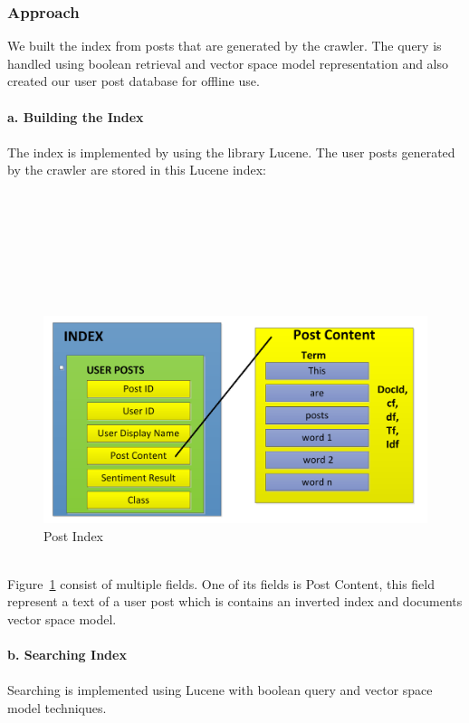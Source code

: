 \subsubsection*{Approach}
	We built the index from posts that are generated by the crawler. The query is handled using boolean retrieval and vector space model representation and also created our user post database for offline use.\\\\
	\textbf{a. Building the Index} \\\\
	The index is implemented by using the library Lucene. The user posts generated by the crawler are stored in this Lucene index: \\\\\\\\\\\\\\\\
	\begin{figure}[h]
		\begin{center}
			\includegraphics[scale=0.4]{images/postindex.png}
		\caption{Post Index\label{post_index}}
		\end{center}
	\end{figure}
	\\Figure~\ref{post_index} consist of multiple fields. One of its fields is Post Content, this field represent a text of a user post which is contains an inverted index and documents vector space model.\\\\
	\textbf{b. Searching Index}\\\\
	Searching is implemented using Lucene with boolean query and vector space model techniques.\\
